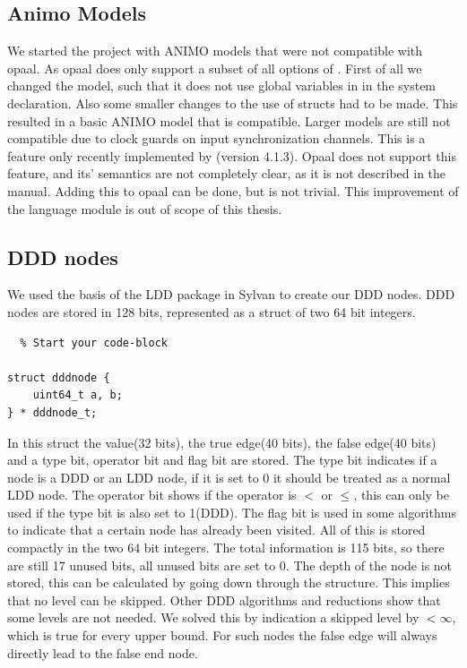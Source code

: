 \subsection{Animo Models}
We started the project with ANIMO models that were not compatible with opaal. As opaal does only support a subset of all options of \uppaal{}. First of all we changed the model, such that it does not use global variables in in the system declaration. Also some smaller changes to the use of structs had to be made. This resulted in a basic ANIMO model that is compatible. Larger models are still not compatible due to clock guards on input synchronization channels. This is a feature only recently implemented by \uppaal{}(version 4.1.3). Opaal does not support this feature, and its' semantics are not completely clear, as it is not described in the manual. Adding this to opaal can be done, but is not trivial. This improvement of the language module is out of scope of this thesis.  

\subsection{DDD nodes}
We used the basis of the LDD package in Sylvan to create our DDD nodes. DDD nodes are stored in 128 bits, represented as a struct of two 64 bit integers.  

\begin{lstlisting}  % Start your code-block

struct dddnode {
    uint64_t a, b;
} * dddnode_t; 
\end{lstlisting}

In this struct the value(32 bits), the true edge(40 bits), the false edge(40 bits) and a type bit, operator bit and flag bit are stored. The type bit indicates if a node is a DDD or an LDD node, if it is set to 0 it should be treated as a normal LDD node. The operator bit shows if the operator is $<$ or $\leq$, this can only be used if the type bit is also set to 1(DDD). The flag bit is used in some algorithms to indicate that a certain node has already been visited. All of this is stored compactly in the two 64 bit integers. The total information is 115 bits, so there are still 17 unused bits, all unused bits are set to 0. The depth of the node is not stored, this can be calculated by going down through the structure. This implies that no level can be skipped. Other DDD algorithms and reductions show that some levels are not needed. We solved this by indication a skipped level by $< \infty$, which is true for every upper bound. For such nodes the false edge will always directly lead to the false end node.

